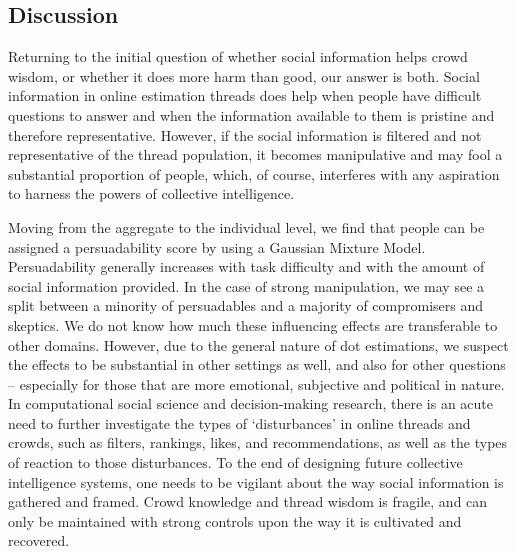 \documentclass[9pt,a4paper,twocolumn,lineno]{article}
\begin{document}

\subsection*{Discussion}
Returning to the initial question of whether social information helps crowd wisdom, or whether it does more harm than good, our answer is both. Social information in online estimation threads does help when people have difficult questions to answer and when the information available to them is pristine and therefore representative. However, if the social information is filtered and not representative of the thread population, it becomes manipulative and may fool a substantial proportion of people, which, of course, interferes with any aspiration to harness the powers of collective intelligence.

Moving from the aggregate to the individual level, we find that people can be assigned a persuadability score by using a Gaussian Mixture Model. Persuadability generally increases with task difficulty and with the amount of social information provided. In the case of strong manipulation, we may see a split between a minority of persuadables and a majority of compromisers and skeptics. We do not know how much these influencing effects are transferable to other domains. However, due to the general nature of dot estimations, we suspect the effects to be substantial in other settings as well, and also for other questions – especially for those that are more emotional, subjective and political in nature. In computational social science and decision-making research,  there is an acute need to further investigate the types of ‘disturbances’ in online threads and crowds, such as filters, rankings, likes, and recommendations, as well as the types of reaction to those disturbances. To the end of designing future collective intelligence systems, one needs to be vigilant about the way social information is gathered and framed. Crowd knowledge and thread wisdom is fragile, and can only be maintained with strong controls upon the way it is cultivated and recovered.
\end{document}
